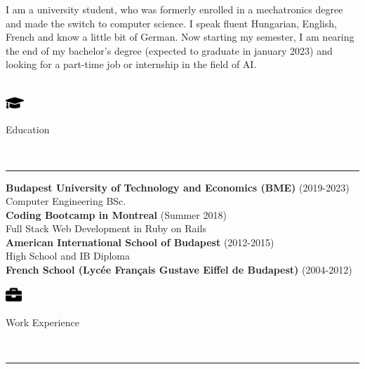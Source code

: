 \documentclass{article}
\begin{document}
I am a university student, who was formerly enrolled in a mechatronics degree and made the switch to computer science. I speak fluent Hungarian, English, French and know a little bit of German. Now starting my  semester, I am nearing the end of my bachelor's degree (expected to graduate in january 2023) and looking for a part-time job or internship in the field of AI. \\
\\
\begin{minipage}[c]{7mm}
    \includegraphics[width=7mm]{../images/graduation-cap-solid.pdf}
\end{minipage}
\begin{minipage}[c]{100mm}
    {\large{Education}}
\end{minipage} \\
\hrule
\bigskip

\noindent
\textbf{Budapest University of Technology and Economics (BME)} \hspace{3mm} \color{gray} (2019-2023) \color{black} \\
Computer Engineering BSc.
\smallskip \\

\noindent
\textbf{Coding Bootcamp in Montreal} \hspace{3mm} \color{gray} (Summer 2018) \color{black} \\
Full Stack Web Development in Ruby on Rails
\smallskip \\

\noindent
\textbf{American International School of Budapest} \hspace{3mm} \color{gray} (2012-2015) \color{black} \\
High School and IB Diploma
\smallskip \\

\noindent
\textbf{French School (Lycée Français Gustave Eiffel de Budapest)} \hspace{3mm} \color{gray} (2004-2012) \color{black} \\
\vspace{1mm}

\noindent
\begin{minipage}[c]{7mm}
    \includegraphics[width=6mm]{../images/briefcase-solid.pdf}
\end{minipage}
\begin{minipage}[c]{100mm}
    {\large{Work Experience}}
\end{minipage} \\
\hrule
\bigskip
\end{document}
